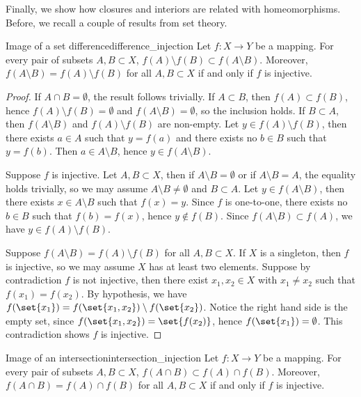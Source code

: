 Finally, we show how closures and interiors are related with homeomorphisms. Before, we recall a couple of results from set theory.
\begin{lemma}{Image of a set difference}{difference_injection}
    Let \(f : X \to Y\) be a mapping. For every pair of subsets \(A, B \subset X\), \(f(A) \setminus f(B) \subset f(A\setminus B)\). Moreover, \(f(A \setminus B) = f(A) \setminus f(B)\) for all \(A, B \subset X\) if and only if \(f\) is injective.
\end{lemma}
\begin{proof}
    If \(A \cap B = \emptyset\), the result follows trivially. If \(A \subset B\), then \(f(A) \subset f(B)\), hence \(f(A) \setminus f(B) = \emptyset\) and \(f(A \setminus B) = \emptyset\), so the inclusion holds. If \(B \subset A\), then \(f(A \setminus B)\) and \(f(A) \setminus f(B)\) are non-empty. Let \(y \in f(A) \setminus f(B)\), then there exists \(a \in A\) such that \(y = f(a)\) and there exists no \(b \in B\) such that \(y = f(b)\). Then \(a \in A \setminus B\), hence \(y \in f(A \setminus B)\).

    Suppose \(f\) is injective. Let \(A, B \subset X\), then if \(A \setminus B = \emptyset\) or if \(A \setminus B = A\), the equality holds trivially, so we may assume \(A \setminus B \neq \emptyset\) and \(B \subset A\). Let \(y \in f(A \setminus B)\), then there exists \(x \in A \setminus B\) such that \(f(x) = y\). Since \(f\) is one-to-one, there exists no \(b \in B\) such that \(f(b) = f(x)\), hence \(y \notin f(B)\). Since \(f(A\setminus B) \subset f(A)\), we have \(y \in f(A) \setminus f(B)\).

    Suppose \(f(A\setminus B) = f(A) \setminus f(B)\) for all \(A, B \subset X\). If \(X\) is a singleton, then \(f\) is injective, so we may assume \(X\) has at least two elements. Suppose by contradiction \(f\) is not injective, then there exist \(x_1, x_2 \in X\) with \(x_1 \neq x_2\) such that \(f(x_1) = f(x_2)\). By hypothesis, we have \(f(\set{x_1}) = f(\set{x_1,x_2}) \setminus f(\set{x_2})\). Notice the right hand side is the empty set, since \(f(\set{x_1, x_2}) = \set{f(x_2)}\), hence \(f(\set{x_1}) = \emptyset\). This contradiction shows \(f\) is injective.
\end{proof}
\begin{lemma}{Image of an intersection}{intersection_injection}
    Let \(f : X \to Y\) be a mapping. For every pair of subsets \(A, B \subset X\), \(f(A \cap B) \subset f(A) \cap f(B)\). Moreover, \(f(A \cap B) = f(A) \cap f(B)\) for all \(A, B \subset X\) if and only if \(f\) is injective.
\end{lemma}
